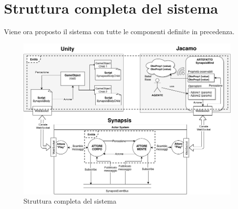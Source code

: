 \section{Struttura completa del sistema}

Viene ora proposto il sistema con tutte le componenti definite in precedenza.

\begin{figure}
    \includegraphics[width=\textwidth]{figures/Synapsis.png}
    \caption{Struttura completa del sistema}
    \label{struttura_sistema_finale}
\end{figure}
